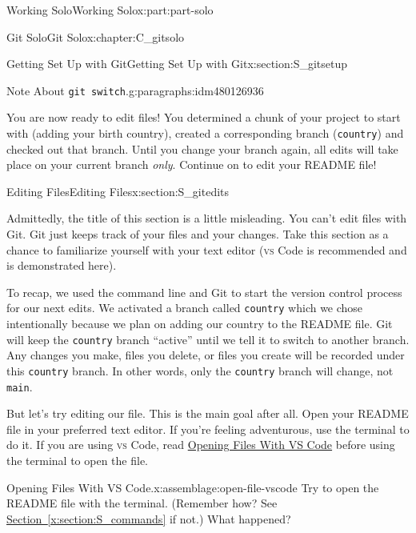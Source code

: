 \documentclass[oneside,10pt,]{book}
\newcommand{\xreffont}{\relax}
\newcommand{\mono}[1]{\texttt{#1}}
\newcommand{\initialism}[1]{\textsc{\MakeLowercase{#1}}}
\DeclareRobustCommand{\initialismintitle}[1]{\texorpdfstring{#1}{#1}}
\begin{document}
\begin{partptx}{Working Solo}{}{Working Solo}{}{}{x:part:part-solo}
\begin{chapterptx}{Git Solo}{}{Git Solo}{}{}{x:chapter:C_gitsolo}
\begin{sectionptx}{Getting Set Up with Git}{}{Getting Set Up with Git}{}{}{x:section:S_gitsetup}
\begin{paragraphs}{Note About \mono{git switch}.}{g:paragraphs:idm480126936}
\end{paragraphs}%
\begin{conclusion}{}%
You are now ready to edit files! You determined a chunk of your project to start with (adding your birth country), created a corresponding branch (\mono{country}) and checked out that branch. Until you change your branch again, all edits will take place on your current branch \emph{only}. Continue on to edit your README file!%
\end{conclusion}%
\end{sectionptx}
%
%
\typeout{************************************************}
\typeout{************************************************}
%
\begin{sectionptx}{Editing Files}{}{Editing Files}{}{}{x:section:S_gitedits}
%
%
%
\begin{introduction}{}%
Admittedly, the title of this section is a little misleading. You can't edit files with Git. Git just keeps track of your files and your changes. Take this section as a chance to familiarize yourself with your text editor (\initialism{VS} Code is recommended and is demonstrated here).%
\end{introduction}%
To recap, we used the command line and Git to start the version control process for our next edits. We activated a branch called \mono{country} which we chose intentionally because we plan on adding our country to the README file. Git will keep the \mono{country} branch ``active'' until we tell it to switch to another branch. Any changes you make, files you delete, or files you create will be recorded under this \mono{country} branch. In other words, only the \mono{country} branch will change, not \mono{main}.%
\par
But let's try editing our file. This is the main goal after all. Open your README file in your preferred text editor. If you're feeling adventurous, use the terminal to do it. If you are using \initialism{VS} Code, read \hyperref[x:assemblage:open-file-vscode]{Opening Files With \initialismintitle{VS} Code} before using the terminal to open the file.%
\begin{assemblage}{Opening Files With \initialismintitle{VS} Code.}{x:assemblage:open-file-vscode}%
Try to open the README file with the terminal. (Remember how? See \hyperref[x:section:S_commands]{Section~{\xreffont\ref{x:section:S_commands}}} if not.) What happened?%
\par

\end{assemblage}
\end{sectionptx}
\end{chapterptx}
\end{partptx}
\end{document}
